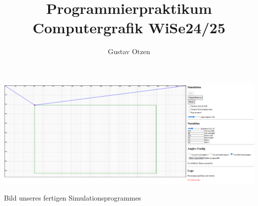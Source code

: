 \documentclass[acmtog, nonacm,table,ngerman]{acmart}
\title{Programmierpraktikum Computergrafik WiSe24/25}
\author{Gustav Otzen}
\begin{document}

\begin{teaserfigure}
\includegraphics[width=\linewidth]{images/simulation_view.png}
\caption{Bild unseres fertigen Simulationsprogrammes}
\label{fig:teaser}
\end{teaserfigure}

\maketitle








%
%
\end{document}
